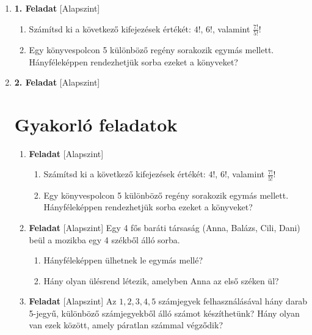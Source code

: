 \documentclass[12pt,a4paper]{article}
\begin{document}
\begin{enumerate}
    
    \item \textbf{1. Feladat} \textsf{\small [Alapszint]}
    \begin{enumerate}[label=\alph*)]
        \item Számítsd ki a következő kifejezések értékét: $4!$, $6!$, valamint $\frac{7!}{5!}$!
        \item Egy könyvespolcon 5 különböző regény sorakozik egymás mellett. Hányféleképpen rendezhetjük sorba ezeket a könyveket?
    \end{enumerate}

    \vspace{0.3cm}

    \item \textbf{2. Feladat} \textsf{\small [Alapszint]}
\section{Gyakorló feladatok}

\begin{enumerate}[leftmargin=*]
    
    \item \textbf{Feladat} \textsf{\small [Alapszint]}
    \begin{enumerate}[label=\alph*)]
        \item Számítsd ki a következő kifejezések értékét: $4!$, $6!$, valamint $\frac{7!}{5!}$!
        \item Egy könyvespolcon 5 különböző regény sorakozik egymás mellett. Hányféleképpen rendezhetjük sorba ezeket a könyveket?
    \end{enumerate}

    \vspace{0.3cm}

    \item \textbf{Feladat} \textsf{\small [Alapszint]}
    Egy 4 fős baráti társaság (Anna, Balázs, Cili, Dani) beül a mozikba egy 4 székből álló sorba.
    \begin{enumerate}[label=\alph*)]
        \item Hányféleképpen ülhetnek le egymás mellé?
        \item Hány olyan ülésrend létezik, amelyben Anna az első széken ül?
    \end{enumerate}

    \vspace{0.3cm}

    \item \textbf{Feladat} \textsf{\small [Alapszint]}
    Az $1, 2, 3, 4, 5$ számjegyek felhasználásával hány darab 5-jegyű, különböző számjegyekből álló számot készíthetünk? Hány olyan van ezek között, amely páratlan számmal végződik?


\end{enumerate}
\end{enumerate}
\end{document}
